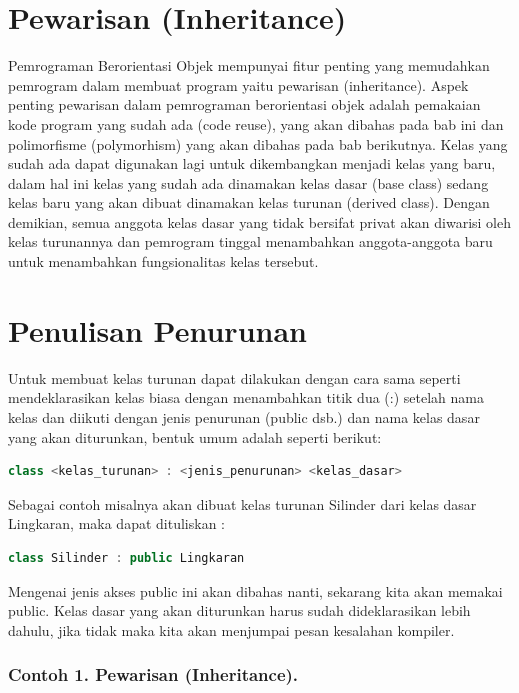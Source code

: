 
\section{Pewarisan (Inheritance)}\label{pewarisan-inheritance}

Pemrograman Berorientasi Objek mempunyai fitur penting yang memudahkan
pemrogram dalam membuat program yaitu pewarisan (inheritance). Aspek
penting pewarisan dalam pemrograman berorientasi objek adalah pemakaian
kode program yang sudah ada (code reuse), yang akan dibahas pada bab ini
dan polimorfisme (polymorhism) yang akan dibahas pada bab berikutnya.
Kelas yang sudah ada dapat digunakan lagi untuk dikembangkan menjadi
kelas yang baru, dalam hal ini kelas yang sudah ada dinamakan kelas
dasar (base class) sedang kelas baru yang akan dibuat dinamakan kelas
turunan (derived class). Dengan demikian, semua anggota kelas dasar yang
tidak bersifat privat akan diwarisi oleh kelas turunannya dan pemrogram
tinggal menambahkan anggota-anggota baru untuk menambahkan
fungsionalitas kelas tersebut.

\section{Penulisan Penurunan}\label{penulisan-penurunan}

Untuk membuat kelas turunan dapat dilakukan dengan cara sama seperti
mendeklarasikan kelas biasa dengan menambahkan titik dua (:) setelah
nama kelas dan diikuti dengan jenis penurunan (public dsb.) dan nama
kelas dasar yang akan diturunkan, bentuk umum adalah seperti berikut:

\begin{lstlisting}[language=c++]
class <kelas_turunan> : <jenis_penurunan> <kelas_dasar>
\end{lstlisting}

Sebagai contoh misalnya akan dibuat kelas turunan Silinder dari kelas
dasar Lingkaran, maka dapat dituliskan :

\begin{lstlisting}[language=c++]
class Silinder : public Lingkaran
\end{lstlisting}

Mengenai jenis akses public ini akan dibahas nanti, sekarang kita akan
memakai public. Kelas dasar yang akan diturunkan harus sudah
dideklarasikan lebih dahulu, jika tidak maka kita akan menjumpai pesan
kesalahan kompiler.

\subsubsection*{Contoh 1. Pewarisan (Inheritance).}

